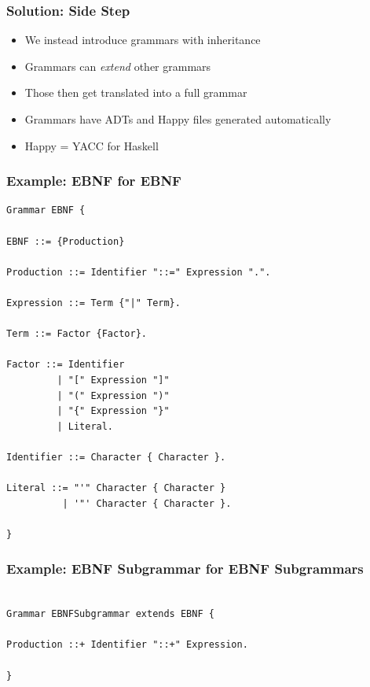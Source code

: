 \documentclass[bigger]{beamer}
\begin{document}
\begin{frame}
\frametitle{Solution: Side Step}
\label{sec-7}


\begin{itemize}
\item We instead introduce grammars with inheritance
\item Grammars can \emph{extend} other grammars
\item Those then get translated into a full grammar
\item Grammars have ADTs and Happy files generated automatically
\item Happy = YACC for Haskell
\end{itemize}
\end{frame}
\begin{frame}[fragile]
\frametitle{Example: EBNF for EBNF}
\label{sec-8}


\scriptsize

\begin{verbatim}
Grammar EBNF {

EBNF ::= {Production}

Production ::= Identifier "::=" Expression ".".

Expression ::= Term {"|" Term}.

Term ::= Factor {Factor}.

Factor ::= Identifier
         | "[" Expression "]"
         | "(" Expression ")"
         | "{" Expression "}"
         | Literal.

Identifier ::= Character { Character }.

Literal ::= "'" Character { Character }
          | '"' Character { Character }.
 
}

\end{verbatim}
\end{frame}
\begin{frame}[fragile]
\frametitle{Example: EBNF Subgrammar for EBNF Subgrammars}
\label{sec-9}


\scriptsize

\begin{verbatim}

Grammar EBNFSubgrammar extends EBNF {

Production ::+ Identifier "::+" Expression.

}

\end{verbatim}
\end{frame}
\end{document}
